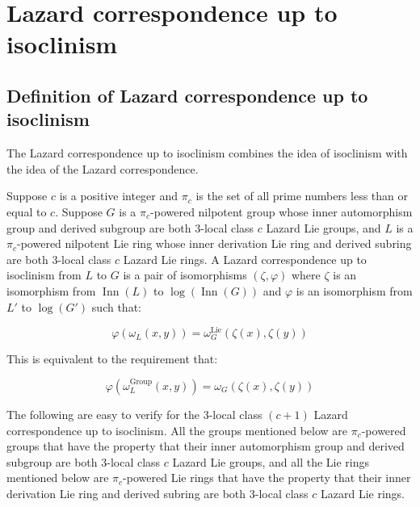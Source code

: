 \documentclass{ucetd}
\begin{document}
\section{Lazard correspondence up to isoclinism}\label{sec:lcuti}

\subsection{Definition of Lazard correspondence up to isoclinism}\label{sec:lcuti-def}

The Lazard correspondence up to isoclinism combines the idea of
isoclinism with the idea of the Lazard correspondence.

\begin{definer}
  Suppose $c$ is a positive integer and $\pi_c$ is the set of all
  prime numbers less than or equal to $c$. Suppose $G$ is a
  $\pi_c$-powered nilpotent group whose inner automorphism group and
  derived subgroup are both $3$-local class $c$ Lazard Lie groups, and
  $L$ is a $\pi_c$-powered nilpotent Lie ring whose inner derivation
  Lie ring and derived subring are both $3$-local class $c$ Lazard Lie
  rings. A Lazard correspondence up to isoclinism from $L$ to $G$ is a
  pair of isomorphisms $(\zeta,\varphi)$ where $\zeta$ is an
  isomorphism from $\operatorname{Inn}(L)$ to
  $\log(\operatorname{Inn}(G))$ and $\varphi$ is an isomorphism from
  $L'$ to $\log(G')$ such that:

  $$\varphi(\omega_L(x,y)) = \omega^{\text{Lie}}_G(\zeta(x),\zeta(y))$$

  This is equivalent to the requirement that:

  $$\varphi(\omega^{\text{Group}}_L(x,y)) = \omega_G(\zeta(x),\zeta(y))$$
\end{definer}

The following are easy to verify for the $3$-local class $(c + 1)$ Lazard
correspondence up to isoclinism. All the groups mentioned below are
$\pi_c$-powered groups that have the property that their inner
automorphism group and derived subgroup are both $3$-local class $c$
Lazard Lie groups, and all the Lie rings mentioned below are
$\pi_c$-powered Lie rings that have the property that their inner
derivation Lie ring and derived subring are both $3$-local class $c$
Lazard Lie rings. %
\end{document}
